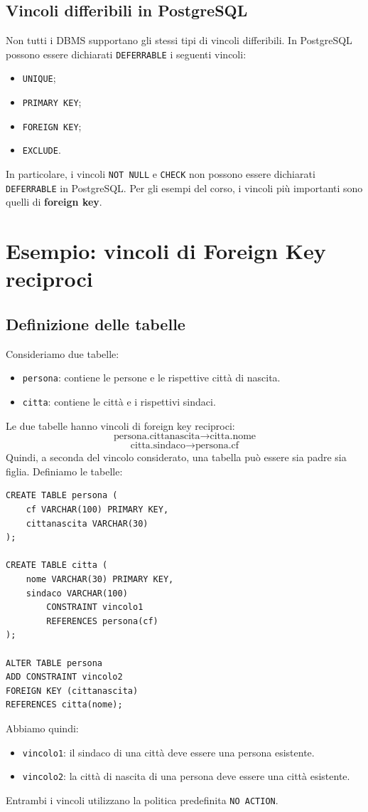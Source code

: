 \subsection{Vincoli differibili in PostgreSQL}
Non tutti i DBMS supportano
gli stessi tipi di vincoli differibili.
In PostgreSQL possono essere
dichiarati \texttt{DEFERRABLE}
i seguenti vincoli:
\begin{itemize}
    \item \texttt{UNIQUE};
    \item \texttt{PRIMARY KEY};
    \item \texttt{FOREIGN KEY};
    \item \texttt{EXCLUDE}.
\end{itemize}
In particolare, i vincoli
\texttt{NOT NULL} e \texttt{CHECK}
non possono essere dichiarati
\texttt{DEFERRABLE} in PostgreSQL.
Per gli esempi del corso,
i vincoli più importanti sono
quelli di \textbf{foreign key}.

\section{Esempio: vincoli di Foreign Key reciproci}
\subsection{Definizione delle tabelle}
Consideriamo due tabelle:
\begin{itemize}
    \item \texttt{persona}: contiene
    le persone e le rispettive città
    di nascita.

    \item \texttt{citta}: contiene
    le città e i rispettivi sindaci.
\end{itemize}
Le due tabelle hanno vincoli
di foreign key reciproci:
\[
\text{persona.cittanascita}
\rightarrow
\text{citta.nome}
\]
\[
\text{citta.sindaco}
\rightarrow
\text{persona.cf}
\]
Quindi, a seconda del vincolo
considerato, una tabella può
essere sia padre sia figlia.
Definiamo le tabelle:
\begin{verbatim}
CREATE TABLE persona (
    cf VARCHAR(100) PRIMARY KEY,
    cittanascita VARCHAR(30)
);

CREATE TABLE citta (
    nome VARCHAR(30) PRIMARY KEY,
    sindaco VARCHAR(100)
        CONSTRAINT vincolo1
        REFERENCES persona(cf)
);

ALTER TABLE persona
ADD CONSTRAINT vincolo2
FOREIGN KEY (cittanascita)
REFERENCES citta(nome);
\end{verbatim}
Abbiamo quindi:
\begin{itemize}
    \item \texttt{vincolo1}:
    il sindaco di una città deve
    essere una persona esistente.

    \item \texttt{vincolo2}:
    la città di nascita di una persona
    deve essere una città esistente.
\end{itemize}
\noindent Entrambi i vincoli utilizzano
la politica predefinita
\texttt{NO ACTION}.
